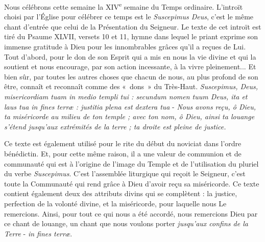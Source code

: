 \documentclass[Session2026.tex]{subfiles}
\begin{document}
Nous célébrons cette semaine la XIV\textsuperscript{e} semaine du Temps ordinaire. 
L'introït choisi par l'Église pour célébrer ce temps est le \emph{Suscepimus Deus}, 
c'est le même chant d'entrée que celui de la
Présentation du Seigneur. Le texte de cet introït est tiré du Psaume
XLVII, versets 10 et 11, hymne dans lequel le priant exprime son immense
gratitude à Dieu pour les innombrables grâces qu'il a reçues de Lui.
Tout d'abord, pour le don de son Esprit qui a mis en nous la vie divine
et qui la soutient et nous encourage, par son action incessante, à la
vivre pleinement... Et bien sûr, par toutes les autres choses que
chacun de nous, au plus profond de son être, connaît et reconnaît comme
des «~dons~» du Très-Haut. \emph{Suscepimus, Deus, misericordiam tuam in
medio templi tui : secundum nomen tuum Deus, ita et laus tua in fines
terræ : justitia plena est dextera tua} - \emph{Nous avons reçu, ô Dieu,
ta miséricorde au milieu de ton temple ; avec ton nom, ô Dieu, ainsi ta
louange s'étend jusqu'aux extrémités de la terre ; ta droite est pleine
de justice.}

Ce texte est également utilisé pour le rite du début du noviciat dans
l'ordre bénédictin. Et, pour cette même raison, il a une valeur de
communion et de communauté qui est à l'origine de l'image du Temple et
de l'utilisation du pluriel du verbe \emph{Suscepimus}. C'est
l'assemblée liturgique qui reçoit le Seigneur, c'est toute la Communauté
qui rend grâce à Dieu d'avoir reçu sa miséricorde. Ce texte contient
également deux des attributs divins qui se complètent : la justice,
perfection de la volonté divine, et la miséricorde, pour laquelle nous
Le remercions. Ainsi, pour tout ce qui nous a été accordé, nous
remercions Dieu par ce chant de louange, un chant que nous voulons
porter \emph{jusqu'aux confins de la Terre} - \emph{in fines terræ}.
\end{document}
